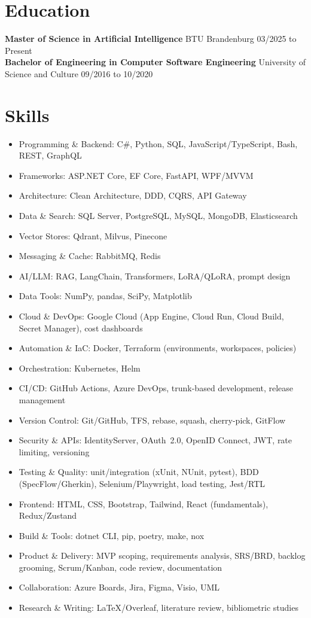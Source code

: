 \documentclass[10pt]{article}
\begin{document}
\section*{Education}
\textbf{Master of Science in Artificial Intelligence} \quad BTU Brandenburg \hfill 03/2025 to Present\\
\textbf{Bachelor of Engineering in Computer Software Engineering} \quad University of Science and Culture \hfill 09/2016 to 10/2020

\section*{Skills}
\begin{multicols}{3}
\begin{itemize}
  \item Programming \& Backend: C\#, Python, SQL, JavaScript/TypeScript, Bash, REST, GraphQL
  \item Frameworks: ASP.NET Core, EF Core, FastAPI, WPF/MVVM
  \item Architecture: Clean Architecture, DDD, CQRS, API Gateway
  \item Data \& Search: SQL Server, PostgreSQL, MySQL, MongoDB, Elasticsearch
  \item Vector Stores: Qdrant, Milvus, Pinecone
  \item Messaging \& Cache: RabbitMQ, Redis
  \item AI/LLM: RAG, LangChain, Transformers, LoRA/QLoRA, prompt design
  \item Data Tools: NumPy, pandas, SciPy, Matplotlib
  \item Cloud \& DevOps: Google Cloud (App Engine, Cloud Run, Cloud Build, Secret Manager), cost dashboards
  \item Automation \& IaC: Docker, Terraform (environments, workspaces, policies)
  \item Orchestration: Kubernetes, Helm
  \item CI/CD: GitHub Actions, Azure DevOps, trunk-based development, release management
  \item Version Control: Git/GitHub, TFS, rebase, squash, cherry-pick, GitFlow
  \item Security \& APIs: IdentityServer, OAuth~2.0, OpenID Connect, JWT, rate limiting, versioning
  \item Testing \& Quality: unit/integration (xUnit, NUnit, pytest), BDD (SpecFlow/Gherkin), Selenium/Playwright, load testing, Jest/RTL
  \item Frontend: HTML, CSS, Bootstrap, Tailwind, React (fundamentals), Redux/Zustand
  \item Build \& Tools: dotnet CLI, pip, poetry, make, nox
  \item Product \& Delivery: MVP scoping, requirements analysis, SRS/BRD, backlog grooming, Scrum/Kanban, code review, documentation
  \item Collaboration: Azure Boards, Jira, Figma, Visio, UML
  \item Research \& Writing: LaTeX/Overleaf, literature review, bibliometric studies
\end{itemize}
\end{multicols}
\end{document}
